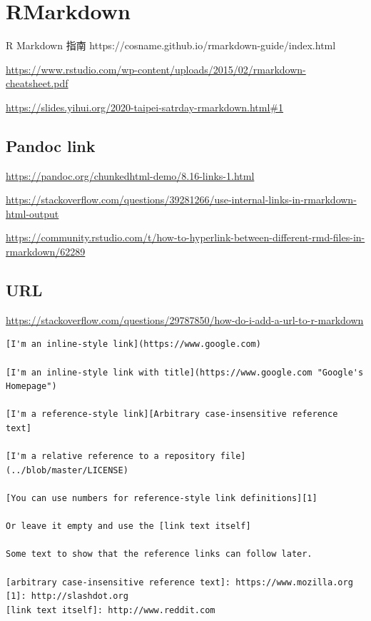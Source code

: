 \documentclass[
]{book}
\theoremstyle{definition}
\theoremstyle{definition}
\theoremstyle{definition}
\theoremstyle{definition}
\theoremstyle{remark}
\begin{document}
\section{RMarkdown}\label{rmarkdown}

\begin{CJK}{UTF8}{bsmi}
R Markdown 指南 https://cosname.github.io/rmarkdown-guide/index.html
\end{CJK}

\url{https://www.rstudio.com/wp-content/uploads/2015/02/rmarkdown-cheatsheet.pdf}

\url{https://slides.yihui.org/2020-taipei-satrday-rmarkdown.html\#1}

\subsection{Pandoc link}\label{pandoc-link}

\url{https://pandoc.org/chunkedhtml-demo/8.16-links-1.html}

\url{https://stackoverflow.com/questions/39281266/use-internal-links-in-rmarkdown-html-output}

\url{https://community.rstudio.com/t/how-to-hyperlink-between-different-rmd-files-in-rmarkdown/62289}

\subsection{URL}\label{url}

\url{https://stackoverflow.com/questions/29787850/how-do-i-add-a-url-to-r-markdown}

\begin{verbatim}
[I'm an inline-style link](https://www.google.com)

[I'm an inline-style link with title](https://www.google.com "Google's Homepage")

[I'm a reference-style link][Arbitrary case-insensitive reference text]

[I'm a relative reference to a repository file](../blob/master/LICENSE)

[You can use numbers for reference-style link definitions][1]

Or leave it empty and use the [link text itself]

Some text to show that the reference links can follow later.

[arbitrary case-insensitive reference text]: https://www.mozilla.org
[1]: http://slashdot.org
[link text itself]: http://www.reddit.com
\end{verbatim}
\end{document}
